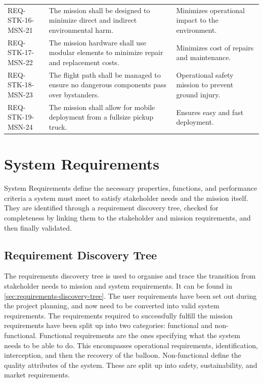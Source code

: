 \begin{xltabular}{\textwidth}{p{0.12\textwidth} X X}
REQ-STK-16-MSN-21 & The mission shall be designed to minimize direct and indirect environmental harm.                                & Minimizes operational impact to the environment.                            \\
REQ-STK-17-MSN-22 & The mission hardware shall use modular elements to minimize repair and replacement costs.                        & Minimizes cost of repairs and maintenance.                                  \\
REQ-STK-18-MSN-23 & The flight path shall be managed to ensure no dangerous components pass over bystanders.                         & Operational safety mission to prevent ground injury. \\
REQ-STK-19-MSN-24 & The mission shall allow for mobile deployment from a fullsize pickup truck.                                      & Ensures easy and fast deployment.                                           \\ \hline
\end{xltabular}
\vspace{-20pt}
\section{System Requirements}
System Requirements define the necessary properties, functions, and performance criteria a system must meet to satisfy stakeholder needs and the mission itself. They are identified through a requirement discovery tree, checked for completeness by linking them to the stakeholder and mission requirements, and then finally validated. 



\vspace{-10pt}
\subsection{Requirement Discovery Tree}\label{ReqTree}
The requirements discovery tree is used to organise and trace the transition from stakeholder needs to mission and system requirements. It can be found in \autoref{sec:requirements-discovery-tree}.
The user requirements have been set out during the project planning, and now need to be converted into valid system requirements. The requirements required to successfully fulfill the mission requirements have been split up into two categories: functional and non-functional.
Functional requirements are the ones specifying what the system needs to be able to do. This encompasses operational requirements, identification, interception, and then the recovery of the balloon. 
Non-functional define the quality attributes of the system. These are split up into safety, sustainability, and market requirements.
\vspace{-10pt}
